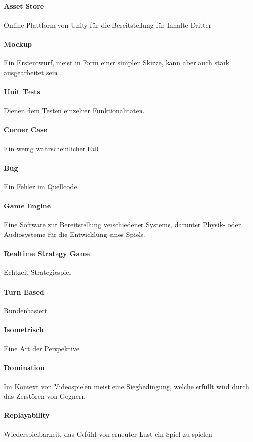 \paragraph*{Asset Store} Online-Plattform von Unity für die Bereitstellung für Inhalte Dritter 
\paragraph*{Mockup} Ein Erstentwurf, meist in Form einer simplen Skizze, kann aber auch stark ausgearbeitet sein
\paragraph*{Unit Tests} Dienen dem Testen einzelner Funktionalitäten.
\paragraph*{Corner Case} Ein wenig wahrscheinlicher Fall 
\paragraph*{Bug} Ein Fehler im Quellcode 
\paragraph*{Game Engine} Eine Software zur Bereitstellung verschiedener Systeme, darunter Physik- oder Audiosysteme für die Entwicklung eines Spiels.
\paragraph*{Realtime Strategy Game} Echtzeit-Strategiespiel
\paragraph*{Turn Based} Rundenbasiert
\paragraph*{Isometrisch} Eine Art der Perspektive
\paragraph*{Domination} Im Kontext von Videospielen meist eine Siegbedingung, welche erfüllt wird durch das Zerstören von Gegnern
\paragraph*{Replayability} Wiederspielbarkeit, das Gefühl von erneuter Lust ein Spiel zu spielen
